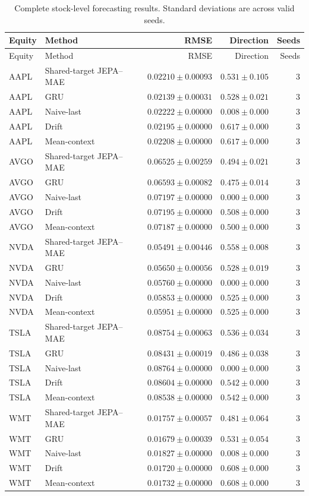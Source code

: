 \begin{longtable}{llrrr}
\caption{Complete stock-level forecasting results. Standard deviations are across valid seeds.}\label{tab:appendix_stock_metrics}\\
\toprule
Equity & Method & RMSE & Direction & Seeds \\
\midrule
\endfirsthead
\toprule
Equity & Method & RMSE & Direction & Seeds \\
\midrule
\endhead
AAPL & Shared-target JEPA--MAE & $0.02210 \pm 0.00093$ & $0.531 \pm 0.105$ & 3 \\
AAPL & GRU & $0.02139 \pm 0.00031$ & $0.528 \pm 0.021$ & 3 \\
AAPL & Naive-last & $0.02222 \pm 0.00000$ & $0.008 \pm 0.000$ & 3 \\
AAPL & Drift & $0.02195 \pm 0.00000$ & $0.617 \pm 0.000$ & 3 \\
AAPL & Mean-context & $0.02208 \pm 0.00000$ & $0.617 \pm 0.000$ & 3 \\
AVGO & Shared-target JEPA--MAE & $0.06525 \pm 0.00259$ & $0.494 \pm 0.021$ & 3 \\
AVGO & GRU & $0.06593 \pm 0.00082$ & $0.475 \pm 0.014$ & 3 \\
AVGO & Naive-last & $0.07197 \pm 0.00000$ & $0.000 \pm 0.000$ & 3 \\
AVGO & Drift & $0.07195 \pm 0.00000$ & $0.508 \pm 0.000$ & 3 \\
AVGO & Mean-context & $0.07187 \pm 0.00000$ & $0.500 \pm 0.000$ & 3 \\
NVDA & Shared-target JEPA--MAE & $0.05491 \pm 0.00446$ & $0.558 \pm 0.008$ & 3 \\
NVDA & GRU & $0.05650 \pm 0.00056$ & $0.528 \pm 0.019$ & 3 \\
NVDA & Naive-last & $0.05760 \pm 0.00000$ & $0.000 \pm 0.000$ & 3 \\
NVDA & Drift & $0.05853 \pm 0.00000$ & $0.525 \pm 0.000$ & 3 \\
NVDA & Mean-context & $0.05951 \pm 0.00000$ & $0.525 \pm 0.000$ & 3 \\
TSLA & Shared-target JEPA--MAE & $0.08754 \pm 0.00063$ & $0.536 \pm 0.034$ & 3 \\
TSLA & GRU & $0.08431 \pm 0.00019$ & $0.486 \pm 0.038$ & 3 \\
TSLA & Naive-last & $0.08764 \pm 0.00000$ & $0.000 \pm 0.000$ & 3 \\
TSLA & Drift & $0.08604 \pm 0.00000$ & $0.542 \pm 0.000$ & 3 \\
TSLA & Mean-context & $0.08538 \pm 0.00000$ & $0.542 \pm 0.000$ & 3 \\
WMT & Shared-target JEPA--MAE & $0.01757 \pm 0.00057$ & $0.481 \pm 0.064$ & 3 \\
WMT & GRU & $0.01679 \pm 0.00039$ & $0.531 \pm 0.054$ & 3 \\
WMT & Naive-last & $0.01827 \pm 0.00000$ & $0.008 \pm 0.000$ & 3 \\
WMT & Drift & $0.01720 \pm 0.00000$ & $0.608 \pm 0.000$ & 3 \\
WMT & Mean-context & $0.01732 \pm 0.00000$ & $0.608 \pm 0.000$ & 3 \\
\bottomrule
\end{longtable}

